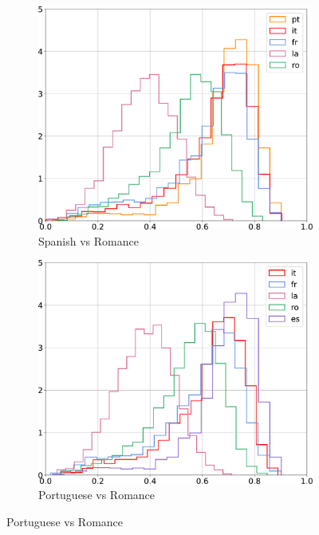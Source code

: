 \documentclass[output=paper]{langsci/langscibook}
\begin{document}
\begin{figure}[!ht]
    \centering
    \begin{subfigure}{0.30\textwidth}
        \includegraphics[width=\linewidth]{figures/UBAN_histogram_distances_es_all_contour.pdf}
        \caption{Spanish vs Romance}
    \end{subfigure}
    \begin{subfigure}{0.30\textwidth}
        \includegraphics[width=\linewidth]{figures/UBAN_histogram_distances_pt_all_contour.pdf}
        \caption{Portuguese vs Romance}
    \end{subfigure}

\end{figure}
\end{document}
